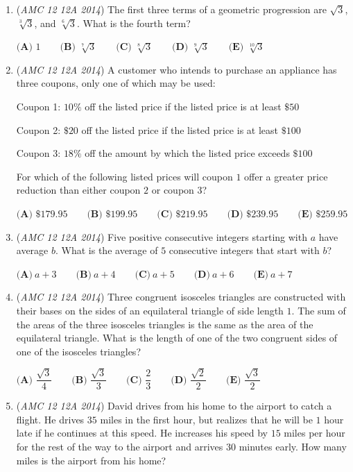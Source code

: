 \begin{enumerate}
 $\textbf{(A) }44\qquad \textbf{(B) }55\qquad \textbf{(C) }77\qquad \textbf{(D) }99\qquad \textbf{(E) }110$


	\item (\textit{AMC 12 12A 2014}) The first three terms of a geometric progression are $\sqrt 3$, $\sqrt[3]3$, and $\sqrt[6]3$.  What is the fourth term?


 $\textbf{(A) }1\qquad \textbf{(B) }\sqrt[7]3\qquad \textbf{(C) }\sqrt[8]3\qquad \textbf{(D) }\sqrt[9]3\qquad \textbf{(E) }\sqrt[10]3\qquad$


	\item (\textit{AMC 12 12A 2014}) A customer who intends to purchase an appliance has three coupons, only one of which may be used:


 Coupon 1: $10\%$ off the listed price if the listed price is at least $\$50$


 Coupon 2: $\$20$ off the listed price if the listed price is at least $\$100$


 Coupon 3: $18\%$ off the amount by which the listed price exceeds $\$100$


 For which of the following listed prices will coupon $1$ offer a greater price reduction than either coupon $2$ or coupon $3$?


 $\textbf{(A) }\$179.95\qquad \textbf{(B) }\$199.95\qquad \textbf{(C) }\$219.95\qquad \textbf{(D) }\$239.95\qquad \textbf{(E) }\$259.95\qquad$


	\item (\textit{AMC 12 12A 2014}) Five positive consecutive integers starting with $a$ have average $b$. What is the average of $5$ consecutive integers that start with $b$?


 $\textbf{(A)}\ a+3\qquad\textbf{(B)}\ a+4\qquad\textbf{(C)}\ a+5\qquad\textbf{(D)}\ a+6\qquad\textbf{(E)}\ a+7$


	\item (\textit{AMC 12 12A 2014}) Three congruent isosceles triangles are constructed with their bases on the sides of an equilateral triangle of side length $1$.  The sum of the areas of the three isosceles triangles is the same as the area of the equilateral triangle.  What is the length of one of the two congruent sides of one of the isosceles triangles?


 $\textbf{(A) }\dfrac{\sqrt3}4\qquad \textbf{(B) }\dfrac{\sqrt3}3\qquad \textbf{(C) }\dfrac23\qquad \textbf{(D) }\dfrac{\sqrt2}2\qquad \textbf{(E) }\dfrac{\sqrt3}2$


	\item (\textit{AMC 12 12A 2014}) David drives from his home to the airport to catch a flight.  He drives $35$ miles in the first hour, but realizes that he will be $1$ hour late if he continues at this speed.  He increases his speed by $15$ miles per hour for the rest of the way to the airport and arrives $30$ minutes early.  How many miles is the airport from his home?



\end{enumerate}
